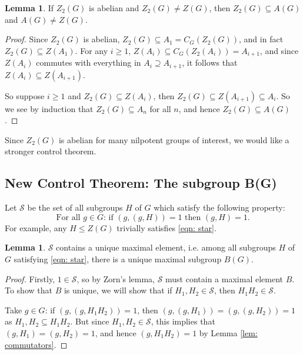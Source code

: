 \documentclass[12pt,a4paper]{article}
\def\({}%
\def\){}%
\theoremstyle{definition}
\newtheorem{lem}[thm]{Lemma}
\theoremstyle{remark}
\theoremstyle{custthm}
\begin{document}
\begin{lem}\label{Z_2 in A}
If $Z_2(G)$ is abelian and $Z_2(G)\neq Z(G)$, then $Z_2(G)\subseteq A(G)$ and $A(G)\neq Z(G)$.
\end{lem}

\begin{proof}

Since $Z_2(G)$ is abelian, $Z_2(G)\subseteq A_1=C_G(Z_2(G))$, and in fact $Z_2(G)\subseteq Z(A_1)$. For any $i\geq 1$, $Z(A_i)\subseteq C_G(Z_2(A_i))=A_{i+1}$, and since $Z(A_i)$ commutes with everything in $A_i\supseteq A_{i+1}$, it follows that $Z(A_i)\subseteq Z(A_{i+1})$.

So suppose $i\geq 1$ and $Z_2(G)\subseteq Z(A_i)$, then $Z_2(G)\subseteq Z(A_{i+1})\subseteq A_i$. So we see by induction that $Z_2(G)\subseteq A_n$ for all $n$, and hence $Z_2(G)\subseteq A(G)$.\end{proof}

Since $Z_2(G)$ is abelian for many nilpotent groups of interest, we would like a stronger control theorem.

\subsection{New Control Theorem: The subgroup \(B(G)\)}\label{subsec: B(G)}

Let $\mathcal{S}$ be the set of all subgroups $H$ of $G$ which satisfy the following property:
\begin{equation}\label{eqn: star}
\tag{$*$}
\text{For all } g\in G:\, \text{if } (g,(g,H)) = 1 \text{ then } (g,H) = 1.
\end{equation}
For example, any $H\leq Z(G)$ trivially satisfies \eqref{eqn: star}.

\begin{lem}\label{lem: there exists unique maximal B}
$\mathcal{S}$ contains a unique maximal element, i.e. among all subgroups $H$ of $G$ satisfying \eqref{eqn: star}, there is a unique maximal subgroup $B(G)$.
\end{lem}

\begin{proof}
Firstly, $1\in \mathcal{S}$, so by Zorn's lemma, $\mathcal{S}$ must contain a maximal element $B$. To show that $B$ is unique, we will show that if $H_1, H_2\in \mathcal{S}$, then $H_1H_2\in \mathcal{S}$. 

Take $g\in G$: if $(g,(g,H_1H_2)) = 1$, then $(g,(g,H_1)) = (g,(g,H_2)) = 1$ as $H_1,H_2\subseteq H_1H_2$. But since $H_1, H_2\in \mathcal{S}$, this implies that $(g,H_1) = (g,H_2) = 1$, and hence $(g, H_1H_2) = 1$ by Lemma \ref{lem: commutators}.\end{proof}
\end{document}

